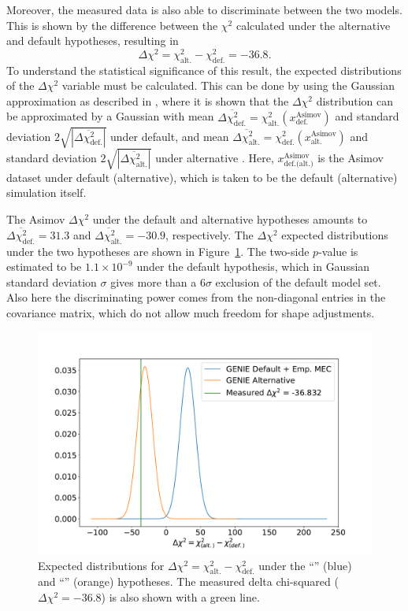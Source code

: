 Moreover, the measured data is also able to discriminate between the two models. This is shown by the difference between the $\chi^2$ calculated under the \g alternative and default hypotheses, resulting in
\begin{equation}
\Delta\chi^2 = \chi^2_\text{alt.} - \chi^2_\text{def.} = -36.8.
\end{equation}
To understand the statistical significance of this result, the expected distributions of the $\Delta\chi^2$ variable must be calculated. This can be done by using the Gaussian approximation as described in \cite{qian_original, qian}, where it is shown that the $\Delta\chi^2$ distribution can be approximated by a Gaussian with mean $\overline{\Delta\chi^2_\text{def.}} = \chi^2_\text{alt.}(x_\text{def.}^\text{Asimov})$ and standard deviation $2\sqrt{|\overline{\Delta\chi^2_\text{def.}}|}$ under \g default, and mean $\overline{\Delta\chi^2_\text{alt.}} = \chi^2_\text{def.}(x_\text{alt.}^\text{Asimov})$ and standard deviation $2\sqrt{|\overline{\Delta\chi^2_\text{alt.}}|}$ under \g alternative . Here, $x_\text{def.(alt.)}^\text{Asimov}$ is the Asimov dataset under \g default (alternative), which is taken to be the \g default (alternative) simulation itself.

The Asimov $\Delta\chi^2$ under the default and alternative hypotheses amounts to $\overline{\Delta\chi^2_\text{def.}} = 31.3$ and $\overline{\Delta\chi^2_\text{alt.}} = -30.9$, respectively. The $\Delta\chi^2$ expected distributions under the two hypotheses are shown in Figure~\ref{fig:chi2}. The two-side $p$-value is estimated to be $1.1 \times 10^{-9}$ under the default hypothesis, which in Gaussian standard deviation $\sigma$ gives more than a $6\sigma$ exclusion of the default model set. Also here the discriminating power comes from the non-diagonal entries in the covariance matrix, which do not allow much freedom for shape adjustments.

\begin{figure}[t]
\centering
\includegraphics[width=.70\textwidth]{images/chi2}
\caption[$\Delta\chi^2$ Expected Distributions]{Expected distributions for $\Delta\chi^2 = \chi^2_\text{alt.} - \chi^2_\text{def.}$ under the ``\tuneone'' (blue) and ``\tunethree'' (orange) hypotheses. The measured delta chi-squared ($\Delta\chi^2 = -36.8$) is also shown with a green line.}
\label{fig:chi2}
\end{figure}


